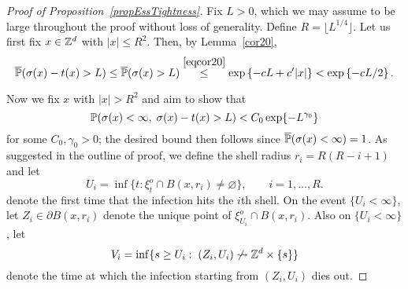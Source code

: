 \begin{proof}[Proof of Proposition~\ref{propEssTightness}]
  Fix $L > 0$, which we may assume to be large throughout the proof without loss of generality. Define $R = \lfloor L^{1/4}\rfloor$. Let us first fix $x \in \Zd$ with $|x| \leq R^2$. Then, by Lemma~\ref{cor20},
\begin{equation}\oP(\sigma(x) - t(x) > L) \leq \oP(\sigma(x) > L) \stackrel{\eqref{eqcor20}}{\leq} \exp\left\{-cL + c'|x|\right\} < \exp\left\{-cL/2\right\}.\label{eq:zeroth_ing}\end{equation}

Now we fix $x$ with $|x| > R^2$ and aim to show that
\begin{equation}\label{eqDestBd}\P(\sigma(x) < \infty,\;\sigma(x) - t(x) > L) < C_0\exp\{-L^{\gamma_0}\}\end{equation}
for some $C_0,\gamma_0 > 0$; the desired bound then follows since $\oP(\sigma(x) < \infty) = 1$. As suggested in the outline of proof, we define the shell radius $r_i = R(R-i+1)$ and let
$$U_i = \inf\{t: \xi_t^o \cap B(x,r_i) \neq \varnothing\},\qquad i = 1,\ldots, R.$$
denote the first time that the infection hits the $i$th shell. On the event $\{U_i < \infty\}$, let $Z_i \in \partial B(x,r_i)$ denote the unique point of $\xi^o_{U_i} \cap B(x, r_i)$. Also on $\{U_i < \infty\}$, let
$$V_i = \inf\{s \geq U_i:\;(Z_i,U_i) \not\rightsquigarrow \Zd \times \{s\}\}$$
	denote the time at which  the infection starting from $(Z_i, U_i)$ dies out.


\end{proof}
